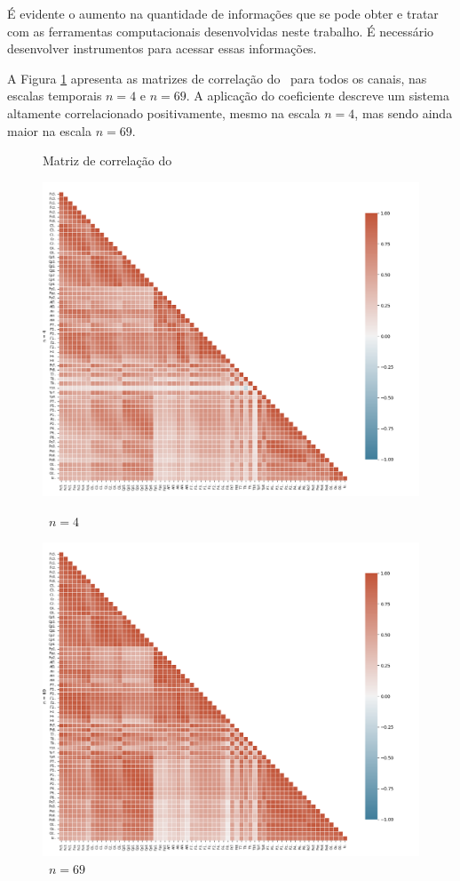 É evidente o aumento na quantidade de informações que se pode obter e tratar com as ferramentas computacionais desenvolvidas neste trabalho. É necessário desenvolver instrumentos para acessar essas informações.

A Figura \ref{fig:mat_cor_pdcca} apresenta as matrizes de correlação do \pdcca~para todos os canais, nas escalas temporais $n=4$ e $n=69$. A aplicação do coeficiente descreve um sistema altamente correlacionado positivamente, mesmo na escala $n=4$, mas sendo ainda maior na escala $n=69$. 
\begin{figure}[ht]
  \caption{Matriz de correlação do \pdcca}\label{fig:mat_cor_pdcca}
  \begin{minipage}[b]{0.45\textwidth}
    \includegraphics[width=\textwidth]{./Figures/test_dmc/pdcca4.png}
    \caption{\pdcca~$n = 4$}
  \end{minipage}
  \hfill
  \begin{minipage}[b]{0.45\textwidth}
    \includegraphics[width=\textwidth]{../Figures/test_dmc/pdcca69.png}
    \caption{\pdcca~$n = 69$}
  \end{minipage}
\end{figure}

